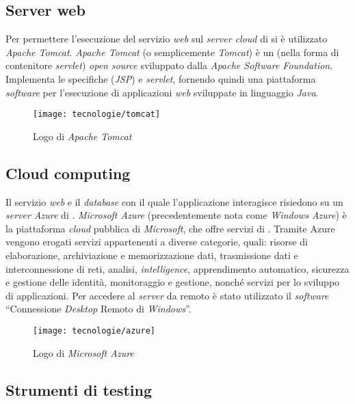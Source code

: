 \newpage

\subsection{Server web}

Per permettere l'esecuzione del servizio \textit{web} sul \textit{server cloud} di \visione{} si è utilizzato \textit{Apache Tomcat}. \textit{Apache Tomcat} (o semplicemente \textit{Tomcat}) è un  (nella forma di contenitore \textit{servlet}) \textit{open source} sviluppato dalla \textit{Apache Software Foundation}. Implementa le specifiche  (\textit{JSP}) e \textit{servlet}, fornendo quindi una piattaforma \textit{software} per l'esecuzione di applicazioni \textit{web} sviluppate in linguaggio \textit{Java}.

\begin{figure}[!h] 
    \centering 
    \texttt{[image: tecnologie/tomcat]} 
    \caption{Logo di \textit{Apache Tomcat}}
\end{figure}

\subsection{Cloud computing}

Il servizio \textit{web} e il \textit{database} con il quale l'applicazione interagisce risiedono su un \textit{server Azure} di \visione{}. \textit{Microsoft Azure} (precedentemente nota come \textit{Windows Azure}) è la piattaforma \textit{cloud} pubblica di \textit{Microsoft}, che offre servizi di . Tramite Azure vengono erogati servizi appartenenti a diverse categorie, quali: risorse di elaborazione, archiviazione e memorizzazione dati, trasmissione dati e interconnessione di reti, analisi, \textit{intelligence}, apprendimento automatico, sicurezza e gestione delle identità, monitoraggio e gestione, nonché servizi per lo sviluppo di applicazioni. Per accedere al \textit{server} da remoto è stato utilizzato il \textit{software} ``Connessione \textit{Desktop} Remoto di \textit{Windows}''.

\begin{figure}[!h] 
    \centering 
    \texttt{[image: tecnologie/azure]} 
    \caption{Logo di \textit{Microsoft Azure}}
\end{figure}

\newpage

\subsection{Strumenti di testing}\label{postman}

